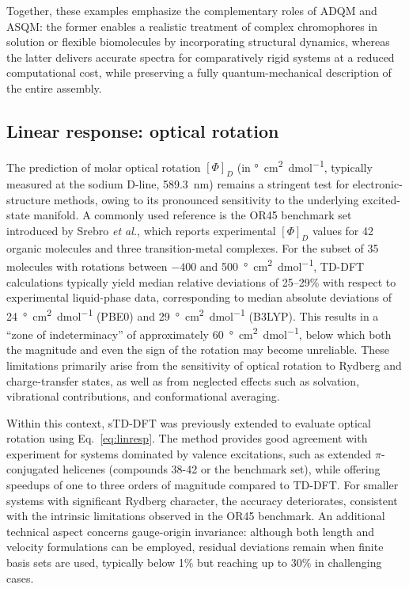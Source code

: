 \documentclass[%
 aip,
 amsmath,amssymb,
preprint,%
]{revtex4-2}
\begin{document}
Together, these examples emphasize the complementary roles of ADQM and ASQM: the former enables a realistic treatment of complex chromophores in solution or flexible biomolecules by incorporating structural dynamics, whereas the latter delivers accurate spectra for comparatively rigid systems at a reduced computational cost, while preserving a fully quantum-mechanical description of the entire assembly.

\subsection{Linear response: optical rotation}

The prediction of molar optical rotation $[\Phi]_D$ (in \si{\degree\centi\meter\squared\per\deci\mole}, typically measured at the sodium D-line, \SI{589.3}{\nano\meter}) remains a stringent test for electronic-structure methods, owing to its pronounced sensitivity to the underlying excited-state manifold.  
A commonly used reference is the OR45 benchmark set introduced by Srebro \textit{et al.},\cite{srebroOpticalRotationCalculated2011} which reports experimental $[\Phi]_D$ values for 42 organic molecules and three transition-metal complexes.  
For the subset of 35 molecules with rotations between $-400$ and \SI{500}{\degree\centi\meter\squared\per\deci\mole}, TD-DFT calculations typically yield median relative deviations of 25--29\% with respect to experimental liquid-phase data, corresponding to median absolute deviations of \SI{24}{\degree\centi\meter\squared\per\deci\mole} (PBE0) and \SI{29}{\degree\centi\meter\squared\per\deci\mole} (B3LYP).  
This results in a ``zone of indeterminacy'' of approximately \SI{60}{\degree\centi\meter\squared\per\deci\mole}, below which both the magnitude and even the sign of the rotation may become unreliable.  
These limitations primarily arise from the sensitivity of optical rotation to Rydberg and charge-transfer states, as well as from neglected effects such as solvation, vibrational contributions, and conformational averaging.

Within this context, sTD-DFT was previously extended\cite{dewergifosseSimplifiedTimedependentDensity2020} to evaluate optical rotation using Eq.~\eqref{eq:linresp}.  
The method provides good agreement with experiment for systems dominated by valence excitations, such as extended $\pi$-conjugated helicenes (compounds 38-42 or the benchmark set), while offering speedups of one to three orders of magnitude compared to TD-DFT.  
For smaller systems with significant Rydberg character, the accuracy deteriorates, consistent with the intrinsic limitations observed in the OR45 benchmark.  
An additional technical aspect concerns gauge-origin invariance: although both length and velocity formulations can be employed, residual deviations remain when finite basis sets are used, typically below 1\% but reaching up to 30\% in challenging cases.
\end{document}
